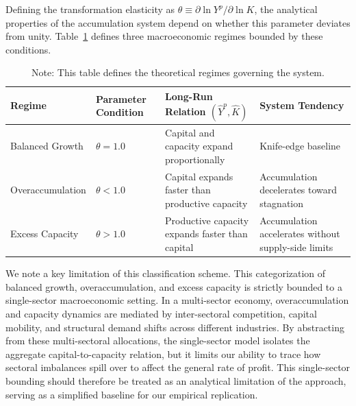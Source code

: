 \documentclass[11pt]{article}
\begin{document}
Defining the transformation elasticity as $\theta \equiv \partial \ln Y^p / \partial \ln K$, the analytical properties of the accumulation system depend on whether this parameter deviates from unity. Table~\ref{tab:growth_regimes} defines three macroeconomic regimes bounded by these conditions.

\begin{table}[H]
\centering
\caption{Accumulation Regimes and the Productive-Capacity Relation}
\label{tab:growth_regimes}
\small
\begin{tabular}{@{}>{\raggedright\arraybackslash}p{3.2cm}>{\centering\arraybackslash}p{1.8cm}>{\raggedright\arraybackslash}p{4.2cm}>{\raggedright\arraybackslash}p{4.0cm}@{}}
\toprule
Regime & Parameter Condition & Long-Run Relation $(\hat{Y}^p,\hat{K})$ & System Tendency \\
\midrule
\midrule
Balanced Growth & $\theta = 1.0$ & Capital and capacity expand proportionally & Knife-edge baseline \\
Overaccumulation & $\theta < 1.0$ & Capital expands faster than productive capacity & Accumulation decelerates toward stagnation \\
Excess Capacity & $\theta > 1.0$ & Productive capacity expands faster than capital & Accumulation accelerates without supply-side limits \\
\bottomrule
\end{tabular}
\caption*{\small Note: This table defines the theoretical regimes governing the system.}
\end{table}

We note a key limitation of this classification scheme. This categorization of balanced growth, overaccumulation, and excess capacity is strictly bounded to a single-sector macroeconomic setting. In a multi-sector economy, overaccumulation and capacity dynamics are mediated by inter-sectoral competition, capital mobility, and structural demand shifts across different industries. By abstracting from these multi-sectoral allocations, the single-sector model isolates the aggregate capital-to-capacity relation, but it limits our ability to trace how sectoral imbalances spill over to affect the general rate of profit. This single-sector bounding should therefore be treated as an analytical limitation of the approach, serving as a simplified baseline for our empirical replication.
\end{document}

